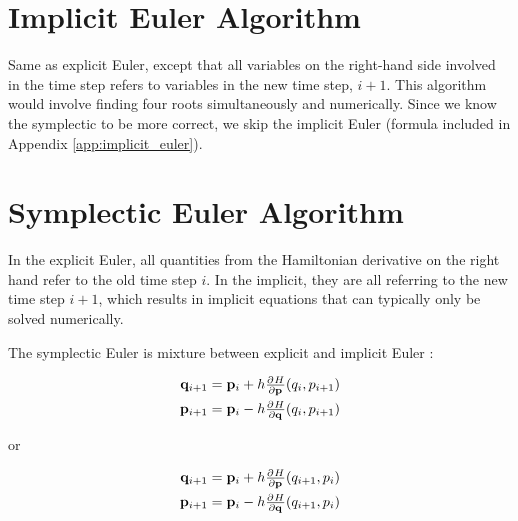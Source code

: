 \section{Implicit Euler Algorithm}
Same as explicit Euler, except that all variables on the right-hand side involved in the time step refers to variables in the new time step, $i+1$. This algorithm would involve finding four roots simultaneously and numerically. Since we know the symplectic to be more correct, we skip the implicit Euler (formula included in Appendix \ref{app:implicit_euler}).

\section{Symplectic Euler Algorithm}
In the explicit Euler, all quantities from the Hamiltonian derivative on the right hand refer to the old time step \(i\). In the implicit, they are all referring to the new time step \(i+1\), which results in implicit equations that can typically only be solved numerically.

The symplectic Euler is mixture between explicit and implicit Euler \cite{Hairer}:

\begin{equation}
    \begin{split} \label{eq:symplectic-euler1}
        \vec{q}_{i+1} = \vec{p}_i + h \pd{H}{\vec{p}}(q_i, p_{i+1}) \\
        \vec{p}_{i+1} = \vec{p}_i - h \pd{H}{\vec{q}}(q_i, p_{i+1})
    \end{split}
\end{equation}

or

\begin{equation}
    \begin{split} \label{eq:symplectic-euler2}
        \vec{q}_{i+1} = \vec{p}_i + h \pd{H}{\vec{p}}(q_{i+1}, p_i) \\
        \vec{p}_{i+1} = \vec{p}_i - h \pd{H}{\vec{q}}(q_{i+1}, p_i)
    \end{split}
\end{equation}

